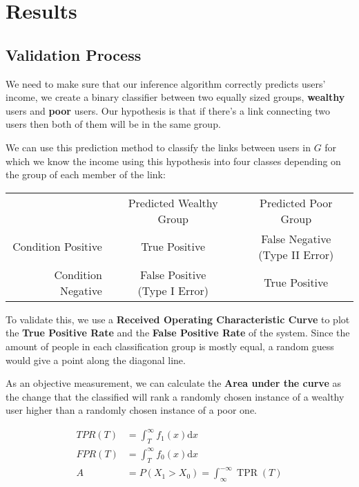 \section{Results}

\subsection{Validation Process}

We need to make sure that our inference algorithm correctly predicts users' income, we create a binary classifier between two equally sized groups, \textbf{wealthy} users and \textbf{poor} users. Our hypothesis is that if there's a link connecting two users then both of them will be in the same group.

We can use this prediction method to classify the links between users in $ G $ for which we know the income using this hypothesis into four classes depending on the group of each member of the link:

\begin{tabularx}{\textwidth}{ r c c }
& Predicted Wealthy Group & Predicted Poor Group \\
Condition Positive & \cellcolor{green} True Positive & \cellcolor{red} \makecell{False Negative \\ (Type II Error)} \\ 
Condition Negative & \cellcolor{red} \makecell{False Positive \\ (Type I Error)} & \cellcolor{green} True Positive \\
\end{tabularx}

To validate this, we use a \textbf{Received Operating Characteristic Curve} to plot the \textbf{True Positive Rate} and the \textbf{False Positive Rate} of the system. Since the amount of people in each classification group is mostly equal, a random guess would give a point along the diagonal line.

As an objective measurement, we can calculate the \textbf{Area under the curve} as the change that the classified will rank a randomly chosen instance of a wealthy user higher than a randomly chosen instance of a poor one.

\begin{align*}
TPR(T) &= \int^{\infty}_T f_1(x) \mathrm{d}x \\
FPR(T) &= \int^{\infty}_T f_0(x) \mathrm{d}x \\
A &= P(X_1 > X_0) = \int^{-\infty}_{\infty} \operatorname{TPR}(T) 
\end{align*}
